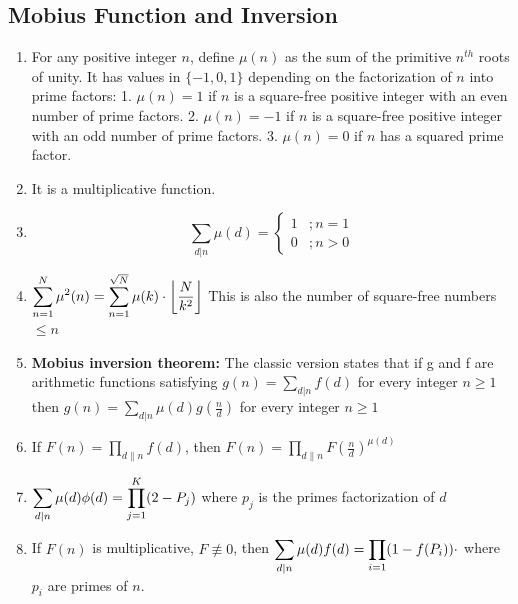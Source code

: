 \subsection{Mobius Function and Inversion}
\begin{enumerate}
\item For any positive integer $n$, define $\displaystyle \mu(n)$ as the sum of the primitive $n^{th}$ roots of unity. It has values in $\displaystyle \{-1, 0, 1\}$ depending on the factorization of $n$ into prime factors: 
     1. $\displaystyle \mu(n)=1$ if $n$ is a square-free positive integer with an even number of prime factors.
     2. $\displaystyle \mu(n)=-1$ if $n$ is a square-free positive integer with an odd number of prime factors.
     3. $\displaystyle \mu(n)=0$ if $n$ has a squared prime factor.
\item It is a multiplicative function.
\item $$ 
        \sum_{d|n}\mu(d) =
        \begin{cases} 
          1 & ; n=1\\
          0 & ; n > 0
       \end{cases}$$
\item $\displaystyle \displaystyle \sum\limits_{n=1}^N {\mu}^2(n) = \displaystyle \sum\limits_{n=1}^{\sqrt{N}} \mu(k) \cdot \left \lfloor \dfrac{N}{k^2} \right\rfloor$
     This is also the number of square-free numbers $\displaystyle \le n$ 
\item \textbf{Mobius inversion theorem:} The classic version states that if g and f are arithmetic functions satisfying
    $g(n) = \displaystyle \sum_{d|n}f(d) $ for every integer $n \ge 1$ then $g(n) = \displaystyle \sum_{d|n}\mu(d)g\left(\frac{n}{d}\right)$ for every integer $n \ge 1$
\item If $\displaystyle F(n) = \displaystyle \prod_{d\|n} f(d)$, then $\displaystyle F(n) = \displaystyle \prod_{d\|n} F\left(\frac{n}{d}\right)^{\mu(d)}$
\item $\displaystyle \displaystyle \sum_{d|n}\mu(d)\phi(d) = \displaystyle \prod_{j=1}^K (2 - P_j)$
    where $\displaystyle p_j$  is the primes factorization of $d$  
\item  If $\displaystyle F(n)$ is multiplicative, $\displaystyle F \not\equiv 0$, then $\displaystyle \displaystyle \sum_{d|n} \mu(d) f(d) = \displaystyle \prod_{i=1} (1 - f(P_i)) \cdot$
    where $\displaystyle p_i$  are primes of $n$.
\end{enumerate}

